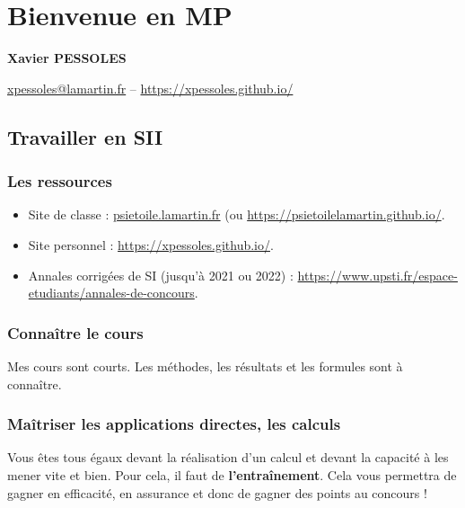 \renewcommand{\repExo}{\repRel/PSI_Cy_01_ModelisationSystemes/Ch_02_RevisionsSLCI/}
\renewcommand{\nomExo}{01_Modelisation_Perf_Fiche}
\graphicspath{{\repStyle/png}{\repExo\nomExo/images}}
%


\setchapterpreamble[u]{\margintoc}

\chapter*{Bienvenue en MP}
\setcounter{chapter}{1}

\begin{center}
\Large
\textsf{\textbf{Xavier PESSOLES}}
\normalsize 

\vspace{.5cm} 

\url{xpessoles@lamartin.fr} -- \url{https://xpessoles.github.io/}
\normalsize
\end{center}
\section{Travailler en SII}
\subsection{Les ressources}
\begin{itemize}
\item Site de classe : \url{psietoile.lamartin.fr} (ou \url{https://psietoilelamartin.github.io/}.
\item Site personnel : \url{https://xpessoles.github.io/}.
\item Annales corrigées de SI (jusqu'à 2021 ou 2022) : \url{https://www.upsti.fr/espace-etudiants/annales-de-concours}. 

\end{itemize}
\subsection{Connaître le cours}
Mes cours sont courts. Les méthodes, les résultats et les formules sont à connaître. 

\subsection{Maîtriser les applications directes, les calculs}
Vous êtes tous égaux devant la réalisation d'un calcul et devant la capacité à les mener vite et bien. 
Pour cela, il faut de \textbf{l’entraînement}. Cela vous permettra de gagner en efficacité, en assurance et donc de gagner des points au concours !

